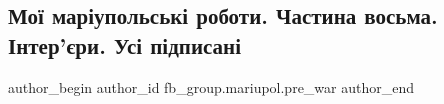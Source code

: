  
 
 
 
 

\subsection{Мої маріупольські роботи. Частина восьма. Інтер’єри. Усі підписані}
\label{sec:18_02_2023.fb.fb_group.mariupol.pre_war.2.mo__mar_upolsk__robo}

\ifcmt
 author_begin
   author_id fb_group.mariupol.pre_war
 author_end
\fi
